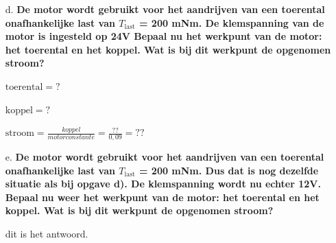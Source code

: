 \begin{enumerate}
    \item [d.] \textbf{De motor wordt gebruikt voor het aandrijven van een toerental onafhankelijke
    last van $T_{\text{last}}$ = 200 mNm. De klemspanning van de motor is ingesteld op 24V
    Bepaal nu het werkpunt van de motor: het toerental en het koppel. Wat is bij dit werkpunt de opgenomen stroom?} 

        $\text{toerental} = ?$
    
        $\text{koppel} = ?$
        
        $\text{stroom} = \frac{koppel}{motorconstante} = \frac{??}{0,09} = ??$

    \item [e.] \textbf{De motor wordt gebruikt voor het aandrijven van een toerental onafhankelijke
    last van $T_{\text{last}}$ = 200 mNm. Dus dat is nog dezelfde situatie als bij opgave d).
    De klemspanning wordt nu echter 12V.
    Bepaal nu weer het werkpunt van de motor: het toerental en het koppel.
    Wat is bij dit werkpunt de opgenomen stroom?}

        dit is het antwoord.

\end{enumerate}
